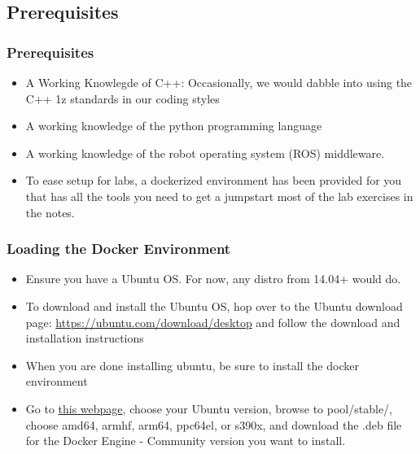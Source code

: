 
\subsection{Prerequisites}
\begin{frame}
	\frametitle{Prerequisites}
	 	\begin{itemize}
	 		 \item A Working Knowlegde of C++: Occasionally, we would dabble into using the C++ 1z standards in our coding styles
	 		\vspace{0.5em}
	 		 \item A working knowledge of the python programming language
	 		\vspace{0.5em}
	 		 \item A working knowledge of the robot operating system (ROS) middleware.
	 		\vspace{0.5em}
	 		 \item To ease setup for labs, a dockerized environment has been provided for you that has all the tools you need to get a jumpstart most of the lab exercises in the notes.
	 	\end{itemize}
\end{frame}

\begin{frame}
	\frametitle{Loading the Docker Environment}
	\begin{itemize}
		\item Ensure you have a Ubuntu OS. For now, any distro from 14.04+ would do.
		\vspace{.5em}
		\item To download and install the Ubuntu OS, hop over to the Ubuntu download page: \href{https://ubuntu.com/download/desktop}{https://ubuntu.com/download/desktop} and follow the download and installation instructions 
		\vspace{.5em}
		\item When you are done installing ubuntu, be sure to install the docker environment 
		\vspace{.5em}
		\item Go to \href{https://download.docker.com/linux/ubuntu/dists/}{ \textsf{this webpage}}, choose your Ubuntu version, browse to  \textsf{pool/stable/, choose amd64, armhf, arm64, ppc64el, or s390x}, and download the  \textsf{.deb} file for the Docker Engine - Community version you want to install.
	\end{itemize}
\end{frame}

